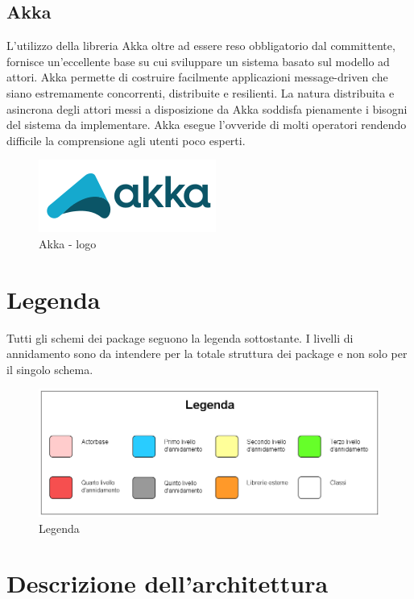 \documentclass[a4paper]{article}
\begin{document}
	\subsection{Akka}
		L'utilizzo della libreria Akka oltre ad essere reso obbligatorio dal committente, fornisce un'eccellente base su cui sviluppare un sistema basato sul modello ad attori.
        Akka permette di costruire facilmente applicazioni message-driven che siano estremamente concorrenti, distribuite e resilienti.         
        La natura distribuita e asincrona degli attori messi a disposizione da Akka soddisfa pienamente i bisogni del sistema da implementare.
        Akka esegue l'ovveride di molti operatori rendendo difficile la comprensione agli utenti poco esperti. 
	\begin{figure} [H]
			\centering
			\includegraphics[scale = 0.5]{immagini/ST/Akka.png}
			\caption{Akka - logo}
		\end{figure}	
	
	
	\newpage 
	\section{Legenda}
	Tutti gli schemi dei package seguono la legenda sottostante. I livelli di annidamento sono da intendere per la totale struttura dei package e non solo per il singolo schema.
		\begin{figure} [H]
			\centering
			\includegraphics[width=\textwidth]{ST/Legenda}
			\caption{Legenda}
		\end{figure}
		
	\section{Descrizione dell'architettura}
\end{document}
